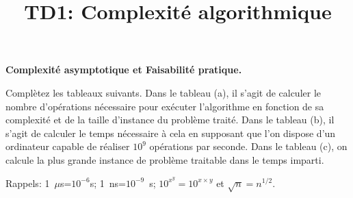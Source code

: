 \documentclass[10pt]{article}\usepackage[correction]{esial}
\begin{document}
\title{TD1: Complexité algorithmique}
\maketitle

\Exercice \textbf{Complexité asymptotique et Faisabilité pratique.}

\Question Complètez les tableaux suivants. Dans le tableau (a), il s'agit de
calculer le nombre d'opérations nécessaire pour exécuter l'algorithme en
fonction de sa complexité et de la taille d'instance du problème traité. Dans
le tableau (b), il s'agit de calculer le temps nécessaire à cela en supposant
que l'on dispose d'un ordinateur capable de réaliser $10^9$ opérations par
seconde. Dans le tableau (c), on calcule la plus grande instance de problème
traitable dans le temps imparti.

Rappels: 1~$\mu$s=$10^{-6}$s; 1~ns=$10^{-9}$~s; $10^{x^y}=10^{x\times y}$ et
$\sqrt{n}=n^{1/2}$.
\end{document}
